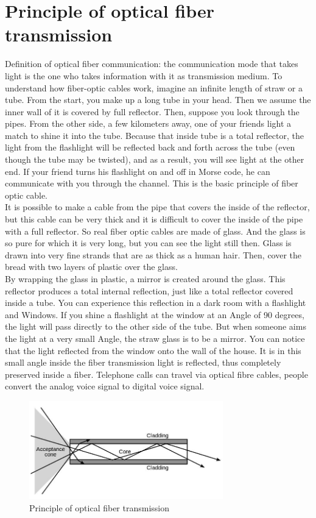 \documentclass[a4paper]{article}
\begin{document}
\section{Principle of optical fiber transmission}
\label{sec:Sec6}
Definition of optical fiber communication: the communication mode that takes light is the one who takes information with it as transmission medium. To understand how fiber-optic cables work, imagine an infinite length of  straw or a tube. From the start, you make up a long tube in your head. Then we assume the inner wall of it is covered by full reflector. Then, suppose you look through the pipes. From the other side, a few kilometers away, one of your friends light a match to shine it into the tube. Because that inside tube is a total reflector, the light from the flashlight will be reflected back and forth across the tube (even though the tube may be twisted), and as a result, you will see light at the other end. If your friend turns his flashlight on and off in Morse code, he can communicate with you through the channel. This is the basic principle of fiber optic cable.
\\

It is possible to make a cable from the pipe that covers the inside of the reflector, but this cable can be very thick and it is difficult to cover the inside of the pipe with a full reflector. So real fiber optic cables are made of glass. And the glass is so pure for which it is very long, but you can see the light still then. Glass is drawn into very fine strands that are as thick as a human hair. Then, cover the bread with two layers of plastic over the glass.
\\

By wrapping the glass in plastic, a mirror is created around the glass. This reflector produces a total internal reflection, just like a total reflector covered inside a tube. You can experience this reflection in a dark room with a flashlight and Windows. If you shine a flashlight at the window at an Angle of 90 degrees, the light will pass directly to the other side of the tube. But when someone aims the light at a very small Angle, the straw glass is to be a mirror. You can notice that the light reflected from the window onto the wall of the house. It is in this small angle inside the fiber transmission light is reflected, thus completely preserved inside a fiber. Telephone calls can travel via optical fibre cables, people convert the analog voice signal to digital voice signal.\cite{Optical Fibre}
\\
\begin{figure}[h]
	\includegraphics[width=0.75\textwidth]{9.png}
		\caption{Principle of optical fiber transmission}
\end{figure}
\end{document}
